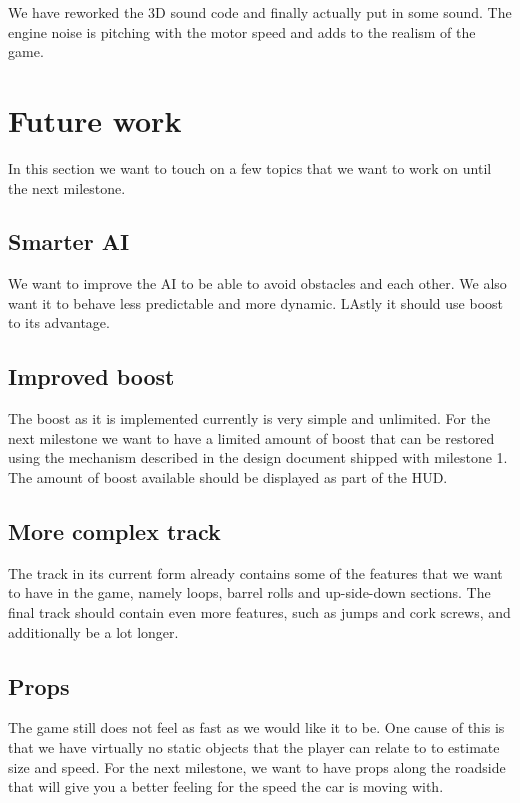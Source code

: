 \documentclass[11pt]{article}
\begin{document}
We have reworked the 3D sound code and finally actually put in some sound. The engine noise is pitching with the motor speed and adds to the realism of the game. 


\section{Future work}
\label{future-work}

In this section we want to touch on a few topics that we want to work on until the next milestone.

\subsection{Smarter AI}

We want to improve the AI to be able to avoid obstacles and each other. We also want it to behave less predictable and more dynamic. LAstly it should use boost to its advantage.

\subsection{Improved boost}

The boost as it is implemented currently is very simple and unlimited. For the next milestone we want to have a limited amount of boost that can be restored using the mechanism described in the design document shipped with milestone 1. The amount of boost available should be displayed as part of the HUD. 

\subsection{More complex track}

The track in its current form already contains some of the features that we want to have in the game, namely loops, barrel rolls and up-side-down sections. The final track should contain even more features, such as jumps and cork screws, and additionally be a lot longer.

\subsection{Props}

The game still does not feel as fast as we would like it to be. One cause of this is that we have virtually no static objects that the player can relate to to estimate size and speed. For the next milestone, we want to have props along the roadside that will give you a better feeling for the speed the car is moving with.
\end{document}
